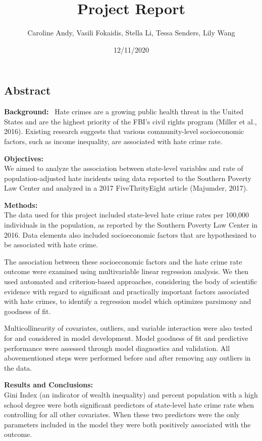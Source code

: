 \documentclass[
]{article}
\title{Project Report}
\author{Caroline Andy, Vasili Fokaidis, Stella Li, Tessa Senders, Lily Wang}
\date{12/11/2020}
\begin{document}
\maketitle

\hypertarget{abstract}{%
\subsection{Abstract}\label{abstract}}

\textbf{Background:}~ Hate crimes are a growing public health threat in
the United States and are the highest priority of the FBI's civil rights
program (Miller et al., 2016). Existing research suggests that various
community-level socioeconomic factors, such as income inequality, are
associated with hate crime rate.

\textbf{Objectives:}\\
We aimed to analyze the association between state-level variables and
rate of population-adjusted hate incidents using data reported to the
Southern Poverty Law Center and analyzed in a 2017 FiveThrityEight
article (Majumder, 2017).

\textbf{Methods:}\\
The data used for this project included state-level hate crime rates per
100,000 individuals in the population, as reported by the Southern
Poverty Law Center in 2016. Data elements also included socioeconomic
factors that are hypothesized to be associated with hate crime.

The association between these socioeconomic factors and the hate crime
rate outcome were examined using multivariable linear regression
analysis. We then used automated and criterion-based approaches,
considering the body of scientific evidence with regard to significant
and practically important factors associated with hate crimes, to
identify a regression model which optimizes parsimony and goodness of
fit.

Multicollinearity of covariates, outliers, and variable interaction were
also tested for and considered in model development. Model goodness of
fit and predictive performance were assessed through model diagnostics
and validation. All abovementioned steps were performed before and after
removing any outliers in the data.

\textbf{Results and Conclusions:}\\
Gini Index (an indicator of wealth inequality) and percent population
with a high school degree were both significant predictors of
state-level hate crime rate when controlling for all other covariates.
When these two predictors were the only parameters included in the model
they were both positively associated with the outcome.
\end{document}
